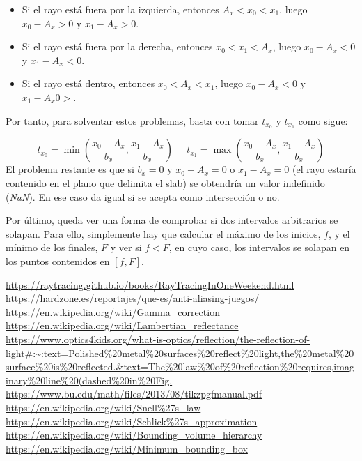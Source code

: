 \documentclass[12pt]{article}
\theoremstyle{definition}
\theoremstyle{remark}
\begin{document}
\begin{itemize}
\item Si el rayo está fuera por la izquierda, entonces $A_x<x_0<x_1$, luego $x_0-A_x>0$ y $x_1-A_x>0$.
\item Si el rayo está fuera por la derecha, entonces $x_0<x_1<A_x$, luego $x_0-A_x<0$ y $x_1-A_x<0$.
\item Si el rayo está dentro, entonces $x_0<A_x<x_1$, luego $x_0-A_x<0$ y $x_1-A_x0>$.
\end{itemize}

Por tanto, para solventar estos problemas, basta con tomar $t_{x_0}$ y $t_{x_1}$ como sigue:

\[
t_{x_0}=\min\left(\frac{x_0-A_x}{b_x},\frac{x_1-A_x}{b_x}\right) \;\;\;\;\;t_{x_1}=\max\left(\frac{x_0-A_x}{b_x},\frac{x_1-A_x}{b_x}\right)
\]
El problema restante es que si $b_x=0$ y $x_0-A_x=0$ o $x_1-A_x=0$ (el rayo estaría contenido en el plano que delimita el slab) se obtendría un valor indefinido (\textit{NaN}). En ese caso da igual si se acepta como intersección o no.

Por último, queda ver una forma de comprobar si dos intervalos arbitrarios se solapan. Para ello, simplemente hay que calcular el máximo de los inicios, $f$, y el mínimo de los finales, $F$ y ver si $f<F$, en cuyo caso, los intervalos se solapan en los puntos contenidos en $[f,F]$. 

\begin{thebibliography}{9}
\url{https://raytracing.github.io/books/RayTracingInOneWeekend.html}
\url{https://hardzone.es/reportajes/que-es/anti-aliasing-juegos/}
\url{https://en.wikipedia.org/wiki/Gamma_correction}
\url{https://en.wikipedia.org/wiki/Lambertian_reflectance}
\url{https://www.optics4kids.org/what-is-optics/reflection/the-reflection-of-light#:~:text=Polished%20metal%20surfaces%20reflect%20light,the%20metal%20surface%20is%20reflected.&text=The%20law%20of%20reflection%20requires,imaginary%20line%20(dashed%20in%20Fig.}
\url{https://www.bu.edu/math/files/2013/08/tikzpgfmanual.pdf}
\url{https://en.wikipedia.org/wiki/Snell%27s_law}
\url{https://en.wikipedia.org/wiki/Schlick%27s_approximation}
\url{https://en.wikipedia.org/wiki/Bounding_volume_hierarchy}
\url{https://en.wikipedia.org/wiki/Minimum_bounding_box}
\end{thebibliography}
\end{document}
